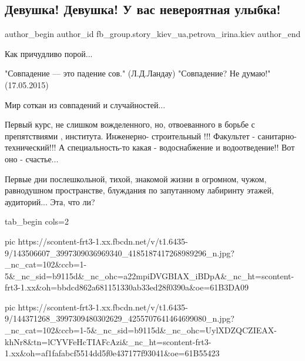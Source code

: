  
 
 
 
 
 
\subsection{Девушка! Девушка! У вас невероятная улыбка!}
\label{sec:29_01_2021.fb.fb_group.story_kiev_ua.1.devushka_ulybka}
 
\ifcmt
 author_begin
   author_id fb_group.story_kiev_ua,petrova_irina.kiev
 author_end
\fi

Как причудливо порой...                   

"Совпадение — это падение сов." (Л.Д.Ландау)
"Совпадение? Не думаю!" (17.05.2015)

Мир соткан из совпадений и случайностей...

Первый курс, не слишком вожделенного, но, отвоеванного в борьбе с препятствиями
, института. Инженерно- строительный !!! Факультет - санитарно-технический!!! А
специальность-то какая - водоснабжение и водоотведение!!  Вот оно - счастье...

Первые дни послешкольной, тихой, знакомой жизни в огромном, чужом, равнодушном
пространстве, блуждания по запутанному лабиринту этажей, аудиторий...  Эта, что
ли?

\ifcmt
  tab_begin cols=2

     pic https://scontent-frt3-1.xx.fbcdn.net/v/t1.6435-9/143506607_3997309036969340_4185187417268989296_n.jpg?_nc_cat=102&ccb=1-5&_nc_sid=b9115d&_nc_ohc=a22mpiDVGBIAX_iBDpA&_nc_ht=scontent-frt3-1.xx&oh=bbdcd862a681151330ab33ed28f0390a&oe=61B3DA09

     pic https://scontent-frt3-1.xx.fbcdn.net/v/t1.6435-9/144371268_3997309480302629_4255707641464699080_n.jpg?_nc_cat=102&ccb=1-5&_nc_sid=b9115d&_nc_ohc=UylXDZQCZIEAX-khNr8&tn=lCYVFeHcTIAFcAzi&_nc_ht=scontent-frt3-1.xx&oh=af1fafabcf5514dd5f0e437177f93041&oe=61B55423


